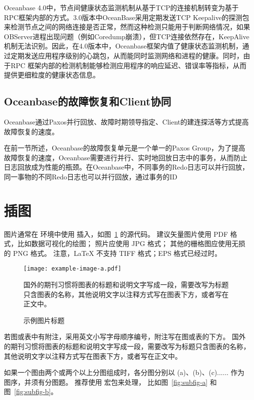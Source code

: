 Oceanbase 4.0中，节点间健康状态监测机制从基于TCP的连接机制转变为基于RPC框架内部的方式。3.0版本中OceanBase采用定期发送TCP Keepalive的探测包来检测节点之间的网络连接是否正常，然而这种检测只能用于判断网络情况，如果OBServer进程出现问题（例如Coredump崩溃），但TCP连接依然存在，KeepAlive机制无法识别。因此，在4.0版本中，Oceanbase框架内值了健康状态监测机制，通过定期发送应用程序级别的心跳包，从而能同时监测网络和进程的健康。同时，由于RPC 框架内部的检测机制能够检测应用程序的响应延迟、错误率等指标，从而提供更细粒度的健康状态信息。

\subsection{Oceanbase的故障恢复和Client协同}

Oceanbase通过Paxos并行回放、故障时期领导指定、Client的建连探活等方式提高故障恢复的速度。

在前一节所述，Oceanbase的故障恢复单元是一个单一的Paxos Group，为了提高故障恢复的速度，Oceanbase需要进行并行、实时地回放日志中的事务，从而防止日志回放成为性能的瓶颈。在Oceanbase中，不同事务的Redo日志可以并行回放，同一事物的不同Redo日志也可以并行回放，通过事务的ID


\section{插图}

图片通常在  环境中使用  插入，如图~\ref{fig:example} 的源代码。
建议矢量图片使用 PDF 格式，比如数据可视化的绘图；
照片应使用 JPG 格式；
其他的栅格图应使用无损的 PNG 格式。
注意，LaTeX 不支持 TIFF 格式；EPS 格式已经过时。

\begin{figure}
  \centering
  \texttt{[image: example-image-a.pdf]}
  \caption*{国外的期刊习惯将图表的标题和说明文字写成一段，需要改写为标题只含图表的名称，其他说明文字以注释方式写在图表下方，或者写在正文中。}
  \caption{示例图片标题}
  \label{fig:example}
\end{figure}

若图或表中有附注，采用英文小写字母顺序编号，附注写在图或表的下方。
国外的期刊习惯将图表的标题和说明文字写成一段，需要改写为标题只含图表的名称，其他说明文字以注释方式写在图表下方，或者写在正文中。

如果一个图由两个或两个以上分图组成时，各分图分别以 (a)、(b)、(c)...... 作为图序，并须有分图题。
推荐使用  宏包来处理， 比如图~\ref{fig:subfig-a} 和图~\ref{fig:subfig-b}。

